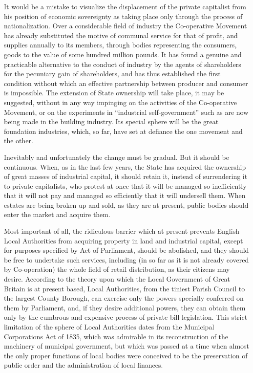 \documentclass{book}
\begin{document}
It would be a mistake to visualize the displacement of the private capitalist from his position of economic sovereignty as taking place only through the process of nationalization. Over a considerable field of industry the Co-operative Movement has already substituted the motive of communal service for that of profit, and supplies annually to its members, through bodies representing the consumers, goods to the value of some hundred million pounds. It has found a genuine and practicable alternative to the conduct of industry by the agents of shareholders for the pecuniary gain of shareholders, and has thus established the first condition without which an effective partnership between producer and consumer is impossible. The extension of State ownership will take place, it may be suggested, without in any way impinging on the activities of the Co-operative Movement, or on the experiments in “industrial self-government” such as are now being made in the building industry. Its special sphere will be the great foundation industries, which, so far, have set at defiance the one movement and the other.

Inevitably and unfortunately the change must be gradual. But it should be continuous. When, as in the last few years, the State has acquired the ownership of great masses of industrial capital, it should retain it, instead of surrendering it to private capitalists, who protest at once that it will be managed so inefficiently that it will not pay and managed so efficiently that it will undersell them. When estates are being broken up and sold, as they are at present, public bodies should enter the market and acquire them.

Most important of all, the ridiculous barrier which at present prevents English Local Authorities from acquiring property in land and industrial capital, except for purposes specified by Act of Parliament, should be abolished, and they should be free to undertake such services, including (in so far as it is not already covered by Co-operation) the whole field of retail distribution, as their citizens may desire. According to the theory upon which the Local Government of Great Britain is at present based, Local Authorities, from the tiniest Parish Council to the largest County Borough, can exercise only the powers specially conferred on them by Parliament, and, if they desire additional powers, they can obtain them only by the cumbrous and expensive process of private bill legislation. This strict limitation of the sphere of Local Authorities dates from the Municipal Corporations Act of 1835, which was admirable in its reconstruction of the machinery of municipal government, but which was passed at a time when almost the only proper functions of local bodies were conceived to be the preservation of public order and the administration of local finances.
\end{document}
